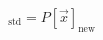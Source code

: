 \documentclass[preview]{standalone}
\begin{document}
\begin{align*}
[\vec{x}]_{\text{std}} = P [\vec{x}]_{\text{new}}
\end{align*}
\end{document}
